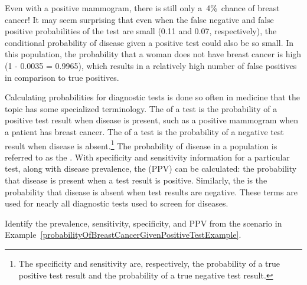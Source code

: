 Even with a positive mammogram, there is still only a~4\%~chance of breast cancer! It may seem surprising that even when the false negative and false positive probabilities of the test are small (0.11 and 0.07, respectively), the conditional probability of disease given a positive test could also be so small. In this population, the probability that a woman does not have breast cancer is high (1 - 0.0035 = 0.9965), which results in a relatively high number of false positives in comparison to true positives.

Calculating probabilities for diagnostic tests is done so often in medicine that the topic has some specialized terminology. The  of a test is the probability of a positive test result when disease is present, such as a positive mammogram when a patient has breast cancer. The  of a test is the probability of a negative test result when disease is absent.\footnote{The specificity and sensitivity are, respectively, the probability of a true positive test result and the probability of a true negative test result.} The probability of disease in a population is referred to as the . With specificity and sensitivity information for a particular test, along with disease prevalence, the  (PPV) can be calculated: the probability that disease is present when a test result is positive. Similarly, the  is the probability that disease is absent when test results are negative. These terms are used for nearly all diagnostic tests used to screen for diseases.

\begin{exercisewrap}
\begin{nexercise}
	Identify the prevalence, sensitivity, specificity, and PPV from the scenario in Example~\ref{probabilityOfBreastCancerGivenPositiveTestExample}.\footnotemark{}
\end{nexercise}
\end{exercisewrap}


\textD{\newpage}


